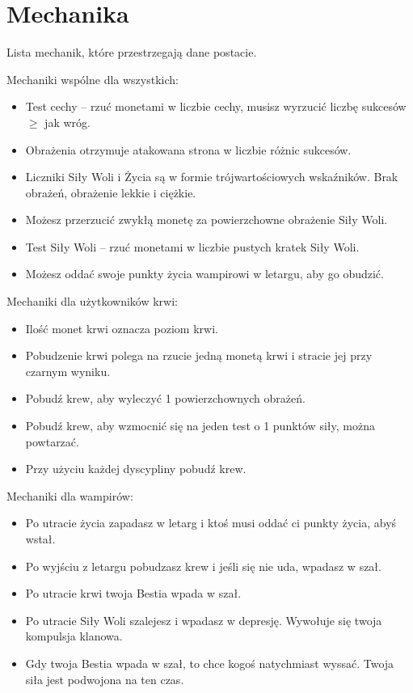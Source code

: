 	
\section{Mechanika}
	Lista mechanik, które przestrzegają dane postacie.
	
	Mechaniki wspólne dla wszystkich:
	\begin{itemize}
		\item Test cechy -- rzuć monetami w liczbie cechy, musisz wyrzucić liczbę sukcesów $\geqslant$ jak wróg.
		\item Obrażenia otrzymuje atakowana strona w liczbie różnic sukcesów.
		\item Liczniki Siły Woli i Życia są w formie trójwartościowych wskaźników. Brak obrażeń, obrażenie lekkie i ciężkie.
		\item Możesz przerzucić zwykłą monetę za powierzchowne obrażenie Siły Woli.
		\item Test Siły Woli -- rzuć monetami w liczbie pustych kratek Siły Woli.
		\item Możesz oddać swoje punkty życia wampirowi w letargu, aby go obudzić.
	\end{itemize}

	Mechaniki dla użytkowników krwi:
	\begin{itemize}
		\item Ilość monet krwi oznacza poziom krwi.
		\item Pobudzenie krwi polega na rzucie jedną monetą krwi i stracie jej przy czarnym wyniku.
		\item Pobudź krew, aby wyleczyć 1 powierzchownych obrażeń.
		\item Pobudź krew, aby wzmocnić się na jeden test o 1 punktów siły, można powtarzać.
		\item Przy użyciu każdej dyscypliny pobudź krew.
	\end{itemize}

	Mechaniki dla wampirów:
	\begin{itemize}
		\item Po utracie życia zapadasz w letarg i ktoś musi oddać ci punkty życia, abyś wstał.
		\item Po wyjściu z letargu pobudzasz krew i jeśli się nie uda, wpadasz w szał.
		\item Po utracie krwi twoja Bestia wpada w szał.
		\item Po utracie Siły Woli szalejesz i wpadasz w depresję. Wywołuje się twoja kompulsja klanowa.
		\item Gdy twoja Bestia wpada w szał, to chce kogoś natychmiast wyssać. Twoja siła jest podwojona na ten czas.
	\end{itemize}

